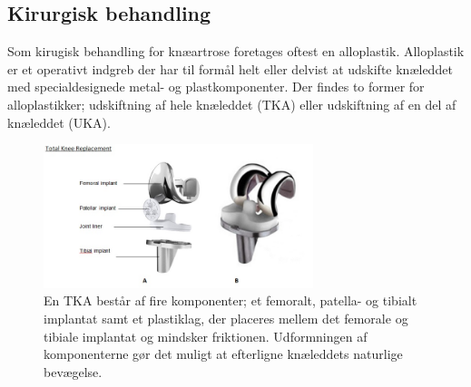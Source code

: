 %

\subsection{Kirurgisk behandling}
Som kirugisk behandling for knæartrose foretages oftest en alloplastik. Alloplastik er et operativt indgreb der har til formål helt eller delvist at udskifte knæleddet med specialdesignede metal- og plastkomponenter. Der findes to former for alloplastikker; udskiftning af hele knæleddet (TKA) eller udskiftning af en del af knæleddet (UKA). \citep{brostrom2012}

\begin{figure}[H] 
\begin{center}
\includegraphics[width=0.7\textwidth]{figures/tka_implant}
\end{center}
\caption{En TKA består af fire komponenter; et femoralt, patella- og tibialt implantat samt et plastiklag, der placeres mellem det femorale og tibiale implantat og mindsker friktionen. Udformningen af komponenterne gør det muligt at efterligne knæleddets naturlige bevægelse. \citep{robodoc2016}} 
\label{fig:tka_implant} 
\end{figure}

